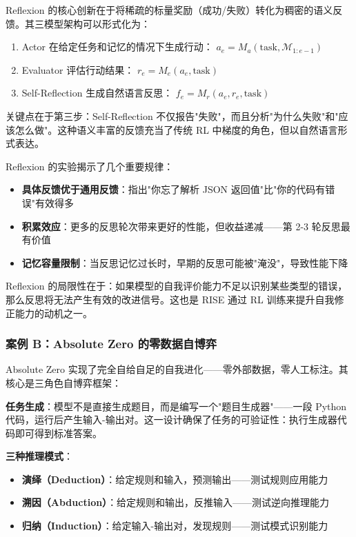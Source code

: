 Reflexion 的核心创新在于将稀疏的标量奖励（成功/失败）转化为稠密的语义反馈。其三模型架构可以形式化为：

\begin{enumerate}
\item Actor 在给定任务和记忆的情况下生成行动：
$a_e = M_a(\text{task}, \mathcal{M}_{1:e-1})$

\item Evaluator 评估行动结果：
$r_e = M_e(a_e, \text{task})$

\item Self-Reflection 生成自然语言反思：
$f_e = M_r(a_e, r_e, \text{task})$
\end{enumerate}

关键点在于第三步：Self-Reflection 不仅报告"失败"，而且分析"为什么失败"和"应该怎么做"。这种语义丰富的反馈充当了传统 RL 中梯度的角色，但以自然语言形式表达。

Reflexion 的实验揭示了几个重要规律：
\begin{itemize}
\item \textbf{具体反馈优于通用反馈}：指出"你忘了解析 JSON 返回值"比"你的代码有错误"有效得多
\item \textbf{积累效应}：更多的反思轮次带来更好的性能，但收益递减——第 2-3 轮反思最有价值
\item \textbf{记忆容量限制}：当反思记忆过长时，早期的反思可能被"淹没"，导致性能下降
\end{itemize}

Reflexion 的局限性在于：如果模型的自我评价能力不足以识别某些类型的错误，那么反思将无法产生有效的改进信号。这也是 RISE 通过 RL 训练来提升自我修正能力的动机之一。

\subsubsection{案例 B：Absolute Zero 的零数据自博弈}

Absolute Zero 实现了完全自给自足的自我进化——零外部数据，零人工标注。其核心是三角色自博弈框架：

\textbf{任务生成}：模型不是直接生成题目，而是编写一个"题目生成器"——一段 Python 代码，运行后产生输入-输出对。这一设计确保了任务的可验证性：执行生成器代码即可得到标准答案。

\textbf{三种推理模式}：
\begin{itemize}
\item \textbf{演绎（Deduction）}：给定规则和输入，预测输出——测试规则应用能力
\item \textbf{溯因（Abduction）}：给定规则和输出，反推输入——测试逆向推理能力
\item \textbf{归纳（Induction）}：给定输入-输出对，发现规则——测试模式识别能力
\end{itemize}

